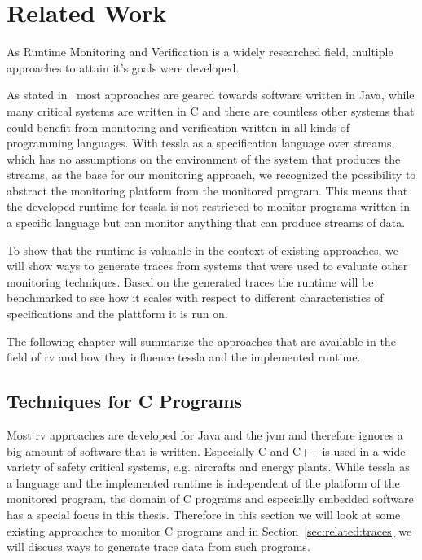 %
\chapter{Related Work}
\label{sec:related}

As Runtime Monitoring and Verification is a widely researched field, multiple approaches to attain it's goals were developed.

As stated in~\cite{Havelund2008} most approaches are geared towards software written in Java, while many critical systems are written in C and there are countless other systems that could benefit from monitoring and verification written in all kinds of programming languages.
With \gls{tessla} as a specification language over streams, which has no assumptions on the environment of the system that produces the streams,  as the base for our monitoring approach, we recognized the possibility to abstract the monitoring platform from the monitored program.
This means that the developed runtime for \gls{tessla} is not restricted to monitor programs written in a specific language but can monitor anything that can produce streams of data.

To show that the runtime is valuable in the context of existing approaches, we will show ways to generate traces from systems that were used to evaluate other monitoring techniques.
Based on the generated traces the runtime will be benchmarked to see how it scales with respect to different characteristics of specifications and the plattform it is run on.

The following chapter will summarize the approaches that are available in the field of \gls{rv} and how they influence \gls{tessla} and the implemented runtime.

\section{ Techniques for C Programs}
\label{sec:related:c_programs}

Most \gls{rv} approaches are developed for Java and the \gls{jvm} and therefore ignores a big amount of software that is written.
Especially C and C++ is used in a wide variety of safety critical systems, e.g. aircrafts and energy plants.
While \gls{tessla} as a language and the implemented runtime is independent of the platform of the monitored program, the domain of C programs and especially embedded software has a special focus in this thesis.
Therefore in this section we will look at some existing approaches to monitor C programs and in Section~\ref{sec:related:traces} we will discuss ways to generate trace data from such programs.

